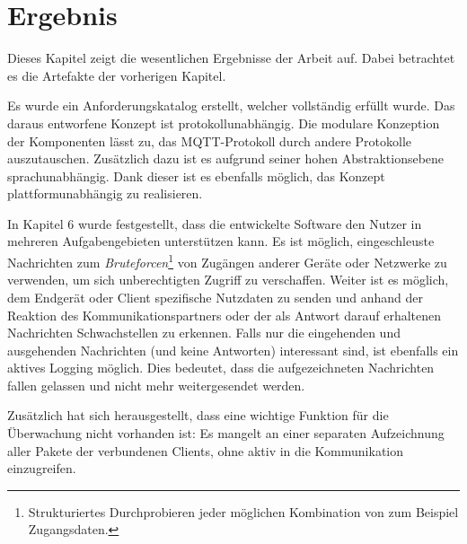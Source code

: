 \chapter{Ergebnis}
Dieses Kapitel zeigt die wesentlichen Ergebnisse der Arbeit auf. Dabei betrachtet es die Artefakte der vorherigen Kapitel.

Es wurde ein Anforderungskatalog erstellt, welcher vollständig erfüllt wurde.
Das daraus entworfene Konzept ist protokollunabhängig. Die modulare Konzeption der Komponenten lässt zu, das \ac{MQTT}-Protokoll durch andere Protokolle auszutauschen. Zusätzlich dazu ist es aufgrund seiner hohen Abstraktionsebene sprachunabhängig. Dank dieser ist es ebenfalls möglich, das Konzept plattformunabhängig zu realisieren.

In Kapitel 6 wurde festgestellt, dass die entwickelte Software den Nutzer in mehreren Aufgabengebieten unterstützen kann.
Es ist möglich, eingeschleuste Nachrichten zum \emph{Bruteforcen}\footnote{Strukturiertes Durchprobieren jeder möglichen Kombination von zum Beispiel Zugangsdaten.} von Zugängen anderer Geräte oder Netzwerke zu verwenden, um sich unberechtigten Zugriff zu verschaffen.
Weiter ist es möglich, dem Endgerät oder Client spezifische Nutzdaten zu senden und anhand der Reaktion des Kommunikationspartners oder der als Antwort darauf  erhaltenen Nachrichten Schwachstellen zu erkennen.
Falls nur die eingehenden und ausgehenden Nachrichten (und keine Antworten) interessant sind, ist ebenfalls ein aktives Logging möglich. Dies bedeutet, dass die aufgezeichneten Nachrichten fallen gelassen und nicht mehr weitergesendet werden.

Zusätzlich hat sich herausgestellt, dass eine wichtige Funktion für die Überwachung nicht vorhanden ist: Es mangelt an einer separaten Aufzeichnung aller Pakete der verbundenen Clients, ohne aktiv in die Kommunikation einzugreifen.
